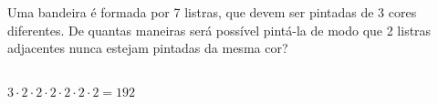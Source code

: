 \begin{ex}
 Uma bandeira é formada por 7 listras, que devem ser pintadas de 3 cores diferentes. De quantas maneiras será possível pintá-la de modo que 2 listras adjacentes nunca estejam pintadas da mesma cor?
     \begin{sol}
       \phantom{A} \\
       $3\cdot2\cdot2\cdot2\cdot2\cdot2\cdot2=192$
     \end{sol}
\end{ex}